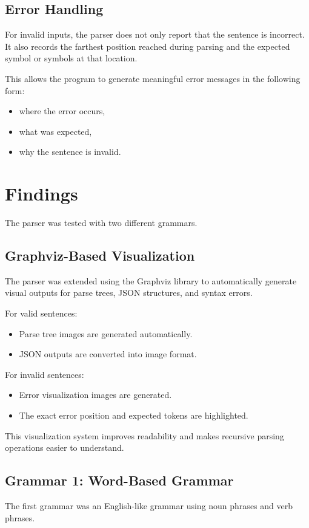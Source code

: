 \documentclass[12pt,a4paper]{article}
\begin{document}
	\subsection{Error Handling}
	For invalid inputs, the parser does not only report that the sentence is incorrect. It also records the farthest position reached during parsing and the expected symbol or symbols at that location.
	
	This allows the program to generate meaningful error messages in the following form:
	\begin{itemize}
		\item where the error occurs,
		\item what was expected,
		\item why the sentence is invalid.
	\end{itemize}
	
	\section{Findings}
	The parser was tested with two different grammars.
	
	\subsection{Graphviz-Based Visualization}
	
	The parser was extended using the Graphviz library to automatically generate visual outputs for parse trees, JSON structures, and syntax errors.
	
	For valid sentences:
	\begin{itemize}
		\item Parse tree images are generated automatically.
		\item JSON outputs are converted into image format.
	\end{itemize}
	
	For invalid sentences:
	\begin{itemize}
		\item Error visualization images are generated.
		\item The exact error position and expected tokens are highlighted.
	\end{itemize}
	
	This visualization system improves readability and makes recursive parsing operations easier to understand.
	
	
	
	\subsection{Grammar 1: Word-Based Grammar}
	The first grammar was an English-like grammar using noun phrases and verb phrases.
	
\end{document}

